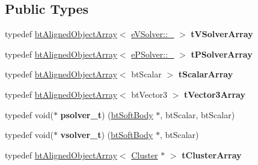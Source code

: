 \subsection*{Public Types}
\begin{DoxyCompactItemize}
\item 
\mbox{\label{classbtSoftBody_a0f0ddd58ae989fdf6b725324860a7759}} 
typedef \hyperlink{classbtAlignedObjectArray}{bt\+Aligned\+Object\+Array}$<$ \hyperlink{structbtSoftBody_1_1eVSolver_ad6a7083f91529d75cab91506cd63e088}{e\+V\+Solver\+::\+\_\+} $>$ {\bfseries t\+V\+Solver\+Array}
\item 
\mbox{\label{classbtSoftBody_ad5509369a941c46766748a84e4f5852c}} 
typedef \hyperlink{classbtAlignedObjectArray}{bt\+Aligned\+Object\+Array}$<$ \hyperlink{structbtSoftBody_1_1ePSolver_a5d6ab41a09da7333bc2047b4ea14bf86}{e\+P\+Solver\+::\+\_\+} $>$ {\bfseries t\+P\+Solver\+Array}
\item 
\mbox{\label{classbtSoftBody_afeb46b2922c843f33480c7f297eb5983}} 
typedef \hyperlink{classbtAlignedObjectArray}{bt\+Aligned\+Object\+Array}$<$ bt\+Scalar $>$ {\bfseries t\+Scalar\+Array}
\item 
\mbox{\label{classbtSoftBody_a8a258d7e5f9bb847ed754e5aa49e6a0e}} 
typedef \hyperlink{classbtAlignedObjectArray}{bt\+Aligned\+Object\+Array}$<$ bt\+Vector3 $>$ {\bfseries t\+Vector3\+Array}
\item 
\mbox{\label{classbtSoftBody_ac4e94d9639e8182fb9dab9ecfc73f500}} 
typedef void($\ast$ {\bfseries psolver\+\_\+t}) (\hyperlink{classbtSoftBody}{bt\+Soft\+Body} $\ast$, bt\+Scalar, bt\+Scalar)
\item 
\mbox{\label{classbtSoftBody_adc9c596fcddd86fe0f48d659a741513f}} 
typedef void($\ast$ {\bfseries vsolver\+\_\+t}) (\hyperlink{classbtSoftBody}{bt\+Soft\+Body} $\ast$, bt\+Scalar)
\item 
\mbox{\label{classbtSoftBody_aea094df073f04d79842b3731c64f8640}} 
typedef \hyperlink{classbtAlignedObjectArray}{bt\+Aligned\+Object\+Array}$<$ \hyperlink{structbtSoftBody_1_1Cluster}{Cluster} $\ast$ $>$ {\bfseries t\+Cluster\+Array}
\item 

\end{DoxyCompactItemize}
